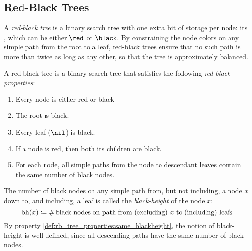 \subsection{Red-Black Trees}
\label{subsec:rb_tree}
A \emph{red-black tree} is a binary search tree with one extra bit of storage per node:
its , which can be either $\red$ or $\black$.
By constraining the node colors on any simple path from the root to a leaf, red-black trees ensure that no such path is more than twice as long as any other, so that the tree is approximately balanced.
\begin{definition}
  \label{def:rb_tree_properties}
  A red-black tree is a binary search tree that satisfies the following \emph{red-black properties}:
  \begin{enumerate}%
    \item Every node is either red or black. \label{def:rb_tree_properties:color}
    \item The root is black. \label{def:rb_tree_properties:root_isblack}
    \item Every leaf ($\nil$) is black. \label{def:rb_tree_properties:leafs_areblack}
    \item If a node is red, then both its children are black. \label{def:rb_tree_properties:redparent_blackchildren}
    \item For each node, all simple paths from the node to descendant leaves contain the same number of black nodes.\label{def:rb_tree_properties:same_blackheight} \qedhere
  \end{enumerate}
\end{definition}
\begin{definition}
The number of black nodes on any simple path from, but \underline{not} including, a node $x$ down to, and including, a leaf is called the \emph{black-height} of the node $x$:
\[
\operatorname{bh}(x) \coloneqq \# \, \text{black nodes on path from (excluding) } x \text{ to (including) leafs}
\]
By property \ref{def:rb_tree_properties:same_blackheight}, the notion of black-height is well defined, since all descending paths have the same number of black nodes.
\end{definition}

